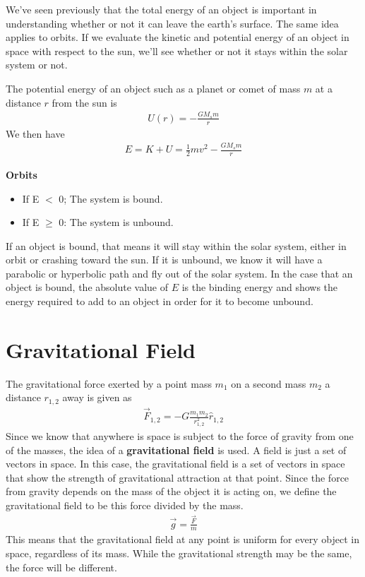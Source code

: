 \documentclass[11pt]{article}
\begin{document}
We've seen previously that the total energy of an object is important in understanding whether or not it can leave the earth's surface. The same idea applies to orbits. If we evaluate the kinetic and potential energy of an object in space with respect to the sun, we'll see whether or not it stays within the solar system or not.

The potential energy of an object such as a planet or comet of mass $m$ at a distance $r$ from the sun is
\begin{align*}
    U(r) = - \frac{GM_s m}{r}
\end{align*}
We then have
\begin{align*}
    E = K + U = \frac{1}{2}mv^2 - \frac{GM_s m}{r}
\end{align*}

\textbf{Orbits}
\begin{itemize}
    \item If E $<$ 0; The system is bound.
    \item If E $\geq$ 0: The system is unbound.
\end{itemize}

If an object is bound, that means it will stay within the solar system, either in orbit or crashing toward the sun. If it is unbound, we know it will have a parabolic or hyperbolic path and fly out of the solar system. In the case that an object is bound, the absolute value of $E$ is the binding energy and shows the energy required to add to an object in order for it to become unbound. 

\section{Gravitational Field}

The gravitational force exerted by a point mass $m_1$ on a second mass $m_2$ a distance $r_{1,2}$ away is given as
\begin{align*}
    \Vec{F}_{1,2} = -G\frac{m_1 m_2}{r^2_{1,2}}\hat{r}_{1,2}
\end{align*}
Since we know that anywhere is space is subject to the force of gravity from one of the masses, the idea of a \textbf{gravitational field} is used. A field is just a set of vectors in space. In this case, the gravitational field is a set of vectors in space that show the strength of gravitational attraction at that point. Since the force from gravity depends on the mass of the object it is acting on, we define the gravitational field to be this force divided by the mass.
\begin{align*}
    \Vec{g} = \frac{\Vec{F}}{m}
\end{align*}
This means that the gravitational field at any point is uniform for every object in space, regardless of its mass. While the gravitational strength may be the same, the force will be different. 
\end{document}
